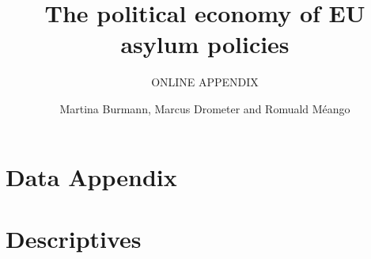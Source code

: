 \documentclass[11pt,a4paper]{scrartcl}
\begin{document}
	\title{The political economy of EU asylum policies}
	\subtitle{ONLINE APPENDIX}
	\author{Martina Burmann, Marcus Drometer and Romuald Méango}
	\maketitle

\tableofcontents

\clearpage
\FloatBarrier
\section{Data Appendix}

\clearpage
\FloatBarrier
\section{Descriptives}


 

 


\clearpage
\FloatBarrier
\end{document}

